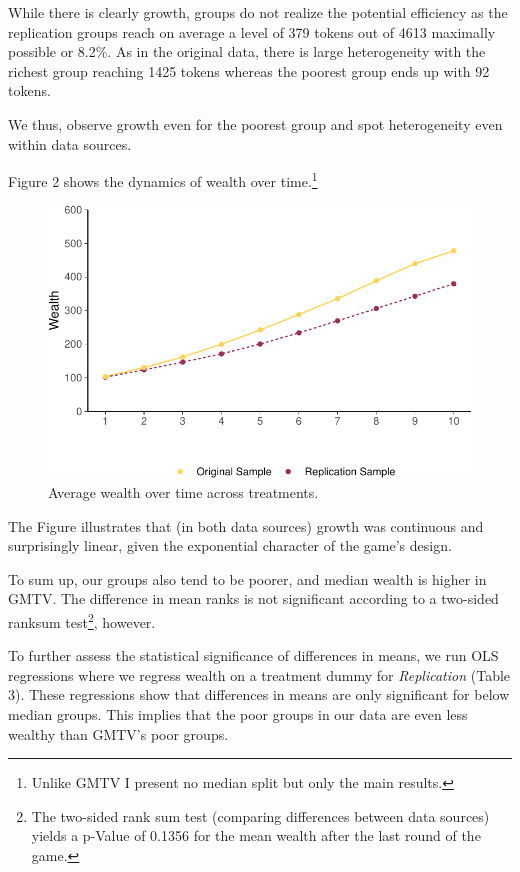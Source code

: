 \documentclass[
  authoryear,
  preprint,
  3p]{elsarticle}
\begin{document}
While there is clearly growth, groups do not realize the potential
efficiency as the replication groups reach on average a level of 379
tokens out of 4613 maximally possible or 8.2\%. As in the original data,
there is large heterogeneity with the richest group reaching 1425 tokens
whereas the poorest group ends up with 92 tokens.

We thus, observe growth even for the poorest group and spot
heterogeneity even within data sources.

Figure 2 shows the dynamics of wealth over time.\footnote{Unlike GMTV I
  present no median split but only the main results.}

\begin{figure}

{\centering \includegraphics{paper_files/figure-pdf/plotStock-1.pdf}

}

\caption{Average wealth over time across treatments.}

\end{figure}

The Figure illustrates that (in both data sources) growth was continuous
and surprisingly linear, given the exponential character of the game's
design.

To sum up, our groups also tend to be poorer, and median wealth is
higher in GMTV. The difference in mean ranks is not significant
according to a two-sided ranksum test\footnote{The two-sided rank sum
  test (comparing differences between data sources) yields a p-Value of
  0.1356 for the mean wealth after the last round of the game.},
however.

To further assess the statistical significance of differences in means,
we run OLS regressions where we regress wealth on a treatment dummy for
\emph{Replication} (Table 3). These regressions show that differences in
means are only significant for below median groups. This implies that
the poor groups in our data are even less wealthy than GMTV's poor
groups.
\end{document}
